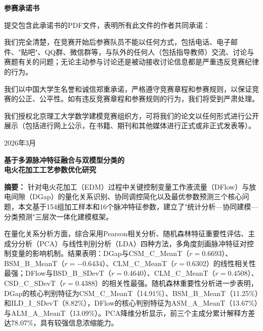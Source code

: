 \documentclass[UTF8,a4paper,12pt]{ctexart}
\begin{document}
\begin{titlepage}
\thispagestyle{empty}
\begin{center}
    {\bfseries 参赛承诺书\par}
    \vspace{2cm}
    \begin{minipage}{0.88\textwidth}
    \linespread{1.5}\selectfont
    提交包含此承诺书的PDF文件，表明所有此文件的作者共同承诺：

    \vspace{1em}
    我们完全清楚，在竞赛开始后参赛队员不能以任何方式，包括电话、电子邮件、"贴吧"、QQ群、微信群等，与队外的任何人（包括指导教师）交流、讨论与赛题有关的问题；无论主动参与讨论还是被动接收讨论信息都是严重违反竞赛纪律的行为。

    \vspace{1em}
    我们以中国大学生名誉和诚信郑重承诺，严格遵守竞赛章程和参赛规则，以保证竞赛的公正、公平性。如有违反竞赛章程和参赛规则的行为，我们将受到严肃处理。

    \vspace{1em}
    我们授权北京理工大学数学建模竞赛组织方，可将我们的论文以任何形式进行公开展示（包括进行网上公示，在书籍、期刊和其他媒体进行正式或非正式发表等）。
    \end{minipage}
    \vfill
    { 2026年3月\par}
\end{center}
\end{titlepage}

\clearpage
\setcounter{page}{1}
\begin{center}
{\bfseries 基于多源脉冲特征融合与双模型分类的\\电火花加工工艺参数优化研究\par}
\end{center}

\vspace{1.2em}
\noindent\textbf{摘要：}
针对电火花加工（EDM）过程中关键控制变量工作液流量（DFlow）与放电间隙（DGap）的量化关系识别、协同调控简化以及最优参数预测三个核心问题，本文基于154组加工样本和16个脉冲特征参数，建立了"统计分析—协同建模—分类预测"三层次一体化建模框架。

在量化关系分析方面，综合采用Pearson相关分析、随机森林特征重要性评估、主成分分析（PCA）与线性判别分析（LDA）四种方法，多角度刻画脉冲特征对控制变量的影响机制。结果表明：DGap与CSM\_C\_MeanT（$r=0.6693$）、BSM\_B\_MeanT（$r=-0.6434$）、CLM\_C\_MeanT（$r=0.6302$）的线性相关性最强；DFlow与BSD\_B\_SDevT（$r=0.4640$）、CLM\_C\_MeanT（$r=0.4508$）、CSD\_C\_SDevT（$r=0.4388$）的相关性最强。随机森林重要性分析进一步表明，DGap的核心判别特征为CSM\_C\_MeanT（14.91\%）、BSM\_B\_MeanT（11.25\%）和ILD\_I\_SDevT（8.82\%），DFlow的核心判别特征为ASM\_A\_MeanT（13.67\%）与ALM\_A\_MeanT（13.09\%）。PCA降维分析显示，前三个主成分累计解释方差达78.07\%，具有较强信息浓缩能力。
\end{document}
